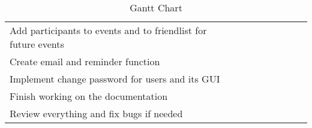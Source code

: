 \begin{table}[h!]
{\begin{tabular}{|l|l|l|l|l|l|l|l|}
   &
   &
   &
   &
  \cellcolor[HTML]{036400} &
   &
   \\ \hline
Add participants to events and to friendlist for future events         &                          &  &  &  & \cellcolor[HTML]{036400} &  &  \\ \hline
Create email and reminder function &
   &
   &
   &
   &
   &
  \cellcolor[HTML]{6200C9} &
   \\ \hline
Implement change password for users and its GUI &
   &
   &
   &
   &
   &
  \cellcolor[HTML]{6200C9} &
   \\ \hline
Finish working on the documentation &
   &
   &
   &
   &
   &
   &
  \cellcolor[HTML]{3531FF} \\ \hline
Review everything and fix bugs if needed &
   &
   &
   &
   &
   &
   &
  \cellcolor[HTML]{3531FF} \\ \hline
\end{tabular}%
}
\caption{Gantt Chart}
\label{tab:gantt}
\end{table}
